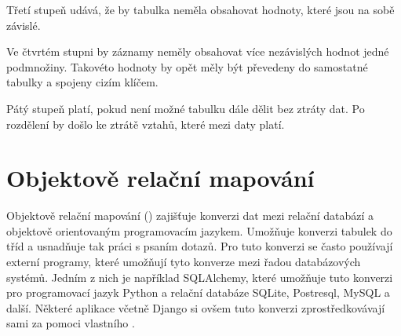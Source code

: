 Třetí stupeň udává, že by tabulka neměla obsahovat hodnoty, které jsou na sobě závislé. 

Ve čtvrtém stupni by záznamy neměly obsahovat více nezávislých hodnot jedné podmnožiny. 
Takovéto hodnoty by opět měly být převedeny do samostatné tabulky a spojeny cizím klíčem.

Pátý stupeň platí, pokud není možné tabulku dále dělit bez ztráty dat. Po 
rozdělení by došlo ke ztrátě vztahů, které mezi daty platí. \cite{normalizace}



\section{Objektově relační mapování}

Objektově relační mapování () zajišťuje konverzi dat mezi relační
databází a objektově orientovaným programovacím jazykem. Umožňuje
konverzi  tabulek do tříd a usnadňuje tak práci s psaním 
dotazů. Pro tuto konverzi se často používají externí programy, které
umožňují tyto konverze mezi řadou databázových systémů. Jedním z nich
je například SQLAlchemy, které umožňuje tuto konverzi pro programovací
jazyk Python a relační databáze SQLite, Postresql, MySQL a
další. Některé aplikace včetně Django si ovšem tuto konverzi
zprostředkovávají sami za pomoci vlastního . \cite{orm}
\cite{sqlalchemy}



















